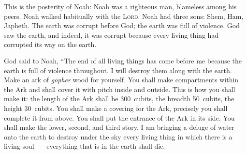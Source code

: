 \begin{inparaenum}
   This is the posterity of Noah: Noah was a righteous man, blameless among his peers. Noah walked habitually with the \textsc{Lord}.%
   Noah had three sons: Shem, Ham, Japheth.%
   The earth was corrupt before God; the earth was full of violence.%
   God saw the earth, and indeed, it was corrupt because every living thing had corrupted its way on the earth.%
  
   God said to Noah, ``The end of all living things has come before me because the earth is full of violence throughout. I will destroy them along with the earth.%
   Make an ark of \textit{gopher} wood for yourself. You shall make compartments within the Ark and shall cover it with pitch inside and outside.%
   This is how you shall make it: the length of the Ark shall be 300~cubits, the breadth 50~cubits, the height 30~cubits.%
   You shall make a covering for the Ark, precisely you shall complete it from above. You shall put the entrance of the Ark in its side. You shall make the lower, second, and third story.\understood%
   I am bringing a deluge of water onto the earth to destroy under the sky every living thing in which there is a living soul~--- everything that is in the earth shall die.%

\end{inparaenum}
